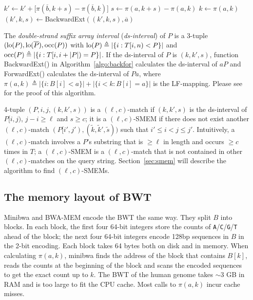 \documentclass[webpdf,contemporary,large,namedate]{oup-authoring-template}%
\begin{document}
\begin{algorithm}[b]
	\caption{Backward and forward extension}\label{algo:backfor}
	\begin{algorithmic}[1]
				\State $k'\gets k'+\big[\pi(\overline{b},k+s)-\pi(\overline{b},k)\big]$
			\EndFor
			\State $s\gets \pi(a,k+s)-\pi(a,k)$
			\State $k\gets \pi(a,k)$
			\State {}
		\EndFunction
			\State $(k',k,s)\gets${\sc BackwardExt}$((k',k,s),\overline{a})$
			\State {}
		\EndFunction
	\end{algorithmic}
\end{algorithm}

The \emph{double-strand suffix array interval} (\emph{ds-interval}) of $P$
is a 3-tuple $({\rm lo}(P),{\rm lo}(\overline{P}),{\rm occ}(P))$ with
${\rm lo}(P)\triangleq|\{i:T[i,n)<P\}|$ and ${\rm occ}(P)\triangleq|\{i:T[i,i+|P|)=P\}|$.
If the ds-interval of $P$ is $(k,k',s)$,
function {\sc BackwardExt()} in Algorithm~\ref{algo:backfor} calculates the ds-interval of $aP$
and {\sc ForwardExt()} calculates the ds-interval of $Pa$,
where $\pi(a,k)\triangleq |\{i:B[i]<a\}|+|\{i<k:B[i]=a\}|$ is the LF-mapping.
Please see \citet{Li:2024ac} for the proof of this algorithm.

4-tuple $(P,i,j,(k,k',s))$ is a $(\ell,c)$-match
if $(k,k',s)$ is the ds-interval of $P[i,j)$, $j-i\ge\ell$ and $s\ge c$;
it is a $(\ell,c)$-SMEM if there does not exist another $(\ell,c)$-match $(P[i',j'), (\tilde{k},\tilde{k}',\tilde{s}))$ such that $i'\le i<j\le j'$.
Intuitively, a $(\ell,c)$-match involves a $P$'s substring that is $\ge\ell$ in length and occurs $\ge c$ times in $T$;
a $(\ell,c)$-SMEM is a $(\ell,c)$-match that is not contained in other $(\ell,c)$-matches on the query string.
Section~\ref{sec:smem} will describe the algorithm to find $(\ell,c)$-SMEMs.

\subsection{The memory layout of BWT}

Minibwa and BWA-MEM encode the BWT the same way.
They split $B$ into blocks.
In each block, the first four 64-bit integers store the counts of {\tt A}/{\tt C}/{\tt G}/{\tt T} ahead of the block;
the next four 64-bit integers encode 128bp sequences in $B$ in the 2-bit encoding.
Each block takes 64 bytes both on disk and in memory.
When calculating $\pi(a,k)$, minibwa finds the address of the block that contains $B[k]$,
reads the counts at the beginning of the block and scans the encoded sequences to get the exact count up to $k$.
The BWT of the human genome takes $\sim$3 GB in RAM and is too large to fit the CPU cache.
Most calls to $\pi(a,k)$ incur cache misses.
\end{document}
